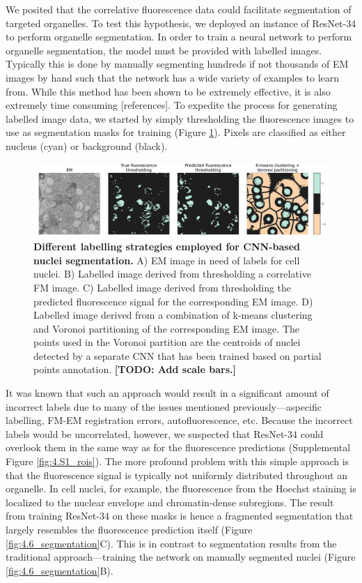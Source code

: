 We posited that the correlative fluorescence data could facilitate segmentation of targeted organelles. To test this hypothesis, we deployed an instance of ResNet-34 \cite{he2016deep} to perform organelle segmentation. In order to train a neural network to perform organelle segmentation, the model must be provided with labelled images. Typically this is done by manually segmenting hundreds if not thousands of EM images by hand such that the network has a wide variety of examples to learn from. While this method has been shown to be extremely effective, it is also extremely time consuming [references]. To expedite the process for generating labelled image data, we started by simply thresholding the fluorescence images to use as segmentation masks for training (Figure \ref{fig:4.5_masks}). Pixels are classified as either nucleus (cyan) or background (black).

\begin{figure}[!tbh]
    \centering
    \includegraphics[width=\linewidth]{chapter-4/figures/segmentation_masks.pdf}
    \caption{\textbf{Different labelling strategies employed for CNN-based nuclei segmentation.}
    A) EM image in need of labels for cell nuclei. B) Labelled image derived from thresholding a correlative FM image. C) Labelled image derived from thresholding the predicted fluorescence signal for the corresponding EM image. D) Labelled image derived from a combination of k-means clustering and Voronoi partitioning of the corresponding EM image. The points used in the Voronoi partition are the centroids of nuclei detected by a separate CNN that has been trained based on partial points annotation.
    \textbf{[TODO: Add scale bars.]}}
    \label{fig:4.5_masks}
\end{figure}

It was known that such an approach would result in a significant amount of incorrect labels due to many of the issues mentioned previously---aspecific labelling, FM-EM registration errors, autofluorescence, etc. Because the incorrect labels would be uncorrelated, however, we suspected that ResNet-34 could overlook them in the same way as for the fluorescence predictions (Supplemental Figure \ref{fig:4.S1_rois}). The more profound problem with this simple approach is that the fluorescence signal is typically not uniformly distributed throughout an organelle. In cell nuclei, for example, the fluorescence from the Hoechst staining is localized to the nuclear envelope and chromatin-dense subregions. The result from training ResNet-34 on these masks is hence a fragmented segmentation that largely resembles the fluorescence prediction itself (Figure \ref{fig:4.6_segmentation}C). This is in contrast to segmentation results from the traditional approach---training the network on manually segmented nuclei (Figure \ref{fig:4.6_segmentation}B).

